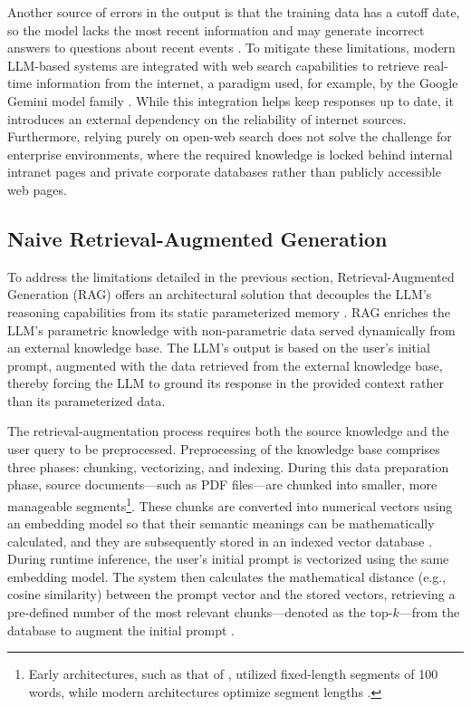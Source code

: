 Another source of errors in the output is that the training data has a cutoff date, so the model lacks the most recent information and may generate incorrect answers to questions about recent events \citep{dhingra2022time}. To mitigate these limitations, modern LLM-based systems are integrated with web search capabilities to retrieve real-time information from the internet, a paradigm used, for example, by the Google Gemini model family \citep{geminiteam2024gemini}. While this integration helps keep responses up to date, it introduces an external dependency on the reliability of internet sources. Furthermore, relying purely on open-web search does not solve the challenge for enterprise environments, where the required knowledge is locked behind internal intranet pages and private corporate databases rather than publicly accessible web pages.

\subsection{Naive Retrieval-Augmented Generation}

To address the limitations detailed in the previous section, Retrieval-Augmented Generation (RAG) offers an architectural solution that decouples the LLM's reasoning capabilities from its static parameterized memory \citep{lewis2020rag}. RAG enriches the LLM's parametric knowledge with non-parametric data served dynamically from an external knowledge base. The LLM's output is based on the user's initial prompt, augmented with the data retrieved from the external knowledge base, thereby forcing the LLM to ground its response in the provided context rather than its parameterized data.

The retrieval-augmentation process requires both the source knowledge and the user query to be preprocessed. Preprocessing of the knowledge base comprises three phases: chunking, vectorizing, and indexing. During this data preparation phase, source documents---such as PDF files---are chunked into smaller, more manageable segments\footnote{Early architectures, such as that of \citet{lewis2020rag}, utilized fixed-length segments of 100 words, while modern architectures optimize segment lengths \citep{demourajunior2026adaptive}.}. These chunks are converted into numerical vectors using an embedding model so that their semantic meanings can be mathematically calculated, and they are subsequently stored in an indexed vector database \citep{gao2023retrieval}. During runtime inference, the user's initial prompt is vectorized using the same embedding model. The system then calculates the mathematical distance (e.g., cosine similarity) between the prompt vector and the stored vectors, retrieving a pre-defined number of the most relevant chunks---denoted as the top-$k$---from the database to augment the initial prompt \citep{johnson2019billion}.

